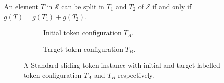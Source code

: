 \begin{example}
An element $T$ in $\mathcal{S}$ can be split in $T_1$ and $T_2$ of $\mathcal{S}$ if and only if $g(T) = g(T_1) + g(T_2)$.
\begin{figure}[H]
  \centering
  \begin{subfigure}[b]{0.4\textwidth}
    \begin{scaletikzpicturetowidth}{\textwidth}
    \end{scaletikzpicturetowidth}
    \caption{Initial token configuration $T_{A}$.}
    \label{fig:standard_1}
  \end{subfigure}
  \begin{subfigure}[b]{0.4\textwidth}
    \begin{scaletikzpicturetowidth}{\textwidth}
    \end{scaletikzpicturetowidth}
    \caption{Target token configuration $T_{B}$.}
    \label{fig:standard_2}
  \end{subfigure}
  \caption{A Standard sliding token instance with initial and target labelled token configuration $T_{A}$ and $T_{B}$ respectively.}
  \label{fig:input_instance_standard}
\end{figure}

\end{example}



